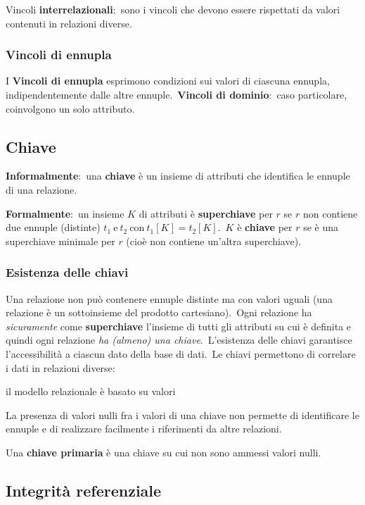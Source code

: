 \noindent Vincoli \textbf{interrelazionali}:\
sono i vincoli che devono essere rispettati da valori contenuti in relazioni diverse.

\subsubsection{Vincoli di ennupla}

I \textbf{Vincoli di ennupla} esprimono condizioni sui valori di ciascuna ennupla, indipendentemente dalle altre ennuple.\
\textbf{Vincoli di dominio}:\ caso particolare, coinvolgono un solo attributo.

\subsection{Chiave}

\textbf{Informalmente}:\ una \textbf{chiave} è un insieme di attributi che identifica le ennuple di una relazione.\

\noindent\textbf{Formalmente}:\ un insieme $K$ di attributi è \textbf{superchiave} per $r$ se $r$ non contiene due ennuple (distinte) $t_1\ \mathrm{e}\ t_2\ \mathrm{con}\ t_1[K] = t_2[K]$.\
$K$ è \textbf{chiave} per $r$ se è una superchiave minimale per $r$ (cioè non contiene un'altra superchiave).

\subsubsection{Esistenza delle chiavi}

Una relazione non può contenere ennuple distinte ma con valori uguali (una relazione è un sottoinsieme del prodotto cartesiano).\
Ogni relazione ha \textit{sicuramente} come \textbf{superchiave} l'insieme di tutti gli attributi su cui è definita e quindi ogni relazione \textit{ha (almeno) una chiave}.\
L'esistenza delle chiavi garantisce l'accessibilità a ciascun dato della base di dati.\
Le chiavi permettono di correlare i dati in relazioni diverse:
\begin{center}
	il modello relazionale è basato su valori
\end{center}
La presenza di valori nulli fra i valori di una chiave non permette di identificare le ennuple e di realizzare facilmente i riferimenti da altre relazioni.

Una \textbf{chiave primaria} è una chiave su cui non sono ammessi valori nulli.

\subsection{Integrità referenziale}

